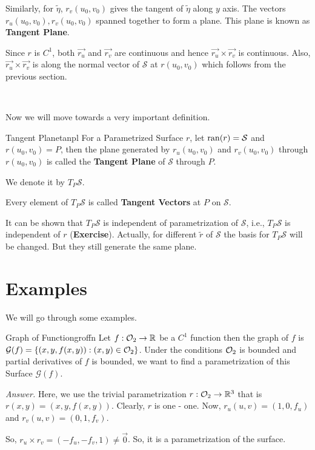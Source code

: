 \documentclass[../Analysis-3.tex]{subfiles}
\begin{document}
Similarly, for $\tilde{\eta}$, $r_v(u_0,v_0)$  gives the tangent of $\tilde{\eta}$ along $y$ axis. The vectors $r_u(u_0,v_0),r_v(u_0,v_0)$ spanned together to form a plane. This plane is known as \textbf{Tangent Plane}.

Since $r$ is $C^1$, both $\vec{r_u}$ and $\vec{r_v}$ are continuous and hence $\vec{r_u} \times \vec{r_v}$ is continuous. Also, $\vec{r_u} \times \vec{r_v}$ is along the normal vector of $\mathcal{S}$ at $r(u_0,v_0)$ which follows from the previous section.

\

Now we will move towards a very important definition.

\begin{Def}{Tangent Plane}{tanpl}
  For a Parametrized Surface $r$, let $\operatorname{ran}(r)=\mathcal{S}$ and $r(u_0,v_0)=P$, then the plane generated by $r_u(u_0,v_0)$ and $r_v(u_0,v_0)$ through $r(u_0,v_0)$ is called the \textbf{Tangent Plane} of $\mathcal{S}$ through $P$.

  We denote it by $T_P\mathcal{S}$.

  Every element of $T_P\mathcal{S}$ is called \textbf{Tangent Vectors} at $P$ on $\mathcal{S}$.
\end{Def}

It can be shown that $T_P\mathcal{S}$ is independent of parametrization of $\mathcal{S}$, i.e., $T_P\mathcal{S}$ is independent of $r$ (\textbf{Exercise}). Actually, for different $\tilde{r}$ of $\mathcal{S}$ the basis for $T_P\mathcal{S}$ will be changed. But they still generate the same plane.

\section{Examples}

We will go through some examples.

\begin{Eg}{Graph of Function}{groffn}
  Let $f : \mathcal{O}_{2} \to \mathbb{R}$ be a $C^1$ function then the graph of $f$ is $\mathcal{G}(f) = \{ (x,y,f(x,y)) : (x,y)\in \mathcal{O}_{2}\}$. Under the conditions $\mathcal{O}_{2}$ is bounded and partial derivatives of $f$ is bounded, we want to find a parametrization of this Surface $\mathcal{G}(f)$.

  \textit{Answer.} Here, we use the trivial parametrization $r : \mathcal{O}_{2} \to \mathbb{R}^3$ that is $ r(x,y) = (x,y,f(x,y))$. Clearly, $r$ is one - one. Now, $r_u(u,v) = (1,0,f_u)$ and $r_v(u,v) = (0,1,f_v)$.

  So, $ r_u \times r_v = (-f_u,-f_v,1) \neq \vec{0}$. So, it is a parametrization of the surface.
\end{Eg}
\end{document}
